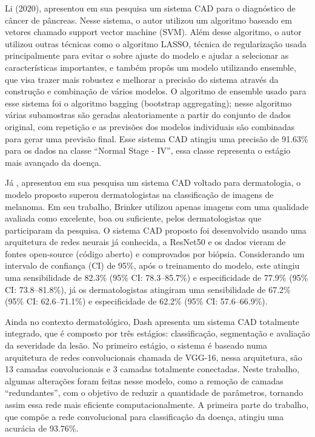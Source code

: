Li (2020), apresentou em sua pesquisa um sistema CAD para o diagnóstico de câncer de pâncreas. Nesse sistema, o autor utilizou um algoritmo baseado em vetores chamado support vector machine (SVM). Além desse algoritmo, o autor utilizou outras técnicas como o algoritmo LASSO, técnica de regularização usada principalmente para evitar o sobre ajuste do modelo e ajudar a selecionar as características importantes, e também propôs um modelo utilizando ensemble, que visa trazer mais robustez e melhorar a precisão do sistema através da construção e combinação de vários modelos. O algoritmo de ensemble usado para esse sistema foi o algoritmo bagging (bootstrap aggregating); nesse algoritmo várias subamostras são geradas aleatoriamente a partir do conjunto de dados original, com repetição e as previsões dos modelos individuais são combinadas para gerar uma previsão final. Esse sistema CAD atingiu uma precisão de 91.63\% para os dados na classe “Normal Stage - IV”, essa classe representa o estágio mais avançado da doença.


Já , apresentou em sua pesquisa um sistema CAD voltado para dermatologia, o modelo proposto superou dermatologistas na classificação de imagens de melanoma. Em seu trabalho, Brinker utilizou apenas imagens com uma qualidade avaliada como excelente, boa ou suficiente, pelos dermatologistas que participaram da pesquisa. O sistema CAD proposto foi desenvolvido usando uma arquitetura de redes neurais já conhecida, a ResNet50 e os dados vieram de fontes open-source (código aberto) e comprovados por biópsia. Considerando um intervalo de confiança (CI) de 95\%, após o treinamento do modelo, este atingiu uma sensibilidade de 82.3\% (95\% CI: 78.3–85.7\%) e especificidade de 77.9\% (95\% CI: 73.8–81.8\%), já os dermatologistas atingiram uma sensibilidade de 67.2\% (95\% CI: 62.6–71.1\%) e especificidade de 62.2\% (95\% CI: 57.6–66.9\%).


Ainda no contexto dermatológico, \citeauthor{DASH2020106240} Dash apresenta um sistema CAD totalmente integrado, que é composto por três estágios: classificação, segmentação e avaliação da severidade da lesão. No primeiro estágio, o sistema é baseado numa arquitetura de redes convolucionais chamada de VGG-16, nessa arquitetura, são 13 camadas convolucionais e 3 camadas totalmente conectadas. Neste trabalho, algumas alterações foram feitas nesse modelo, como a remoção de camadas “redundantes”, com o objetivo de reduzir a quantidade de parâmetros, tornando assim essa rede mais eficiente computacionalmente. A primeira parte do trabalho, que compõe a rede convolucional para classificação da doença, atingiu uma acurácia de 93.76\%.


